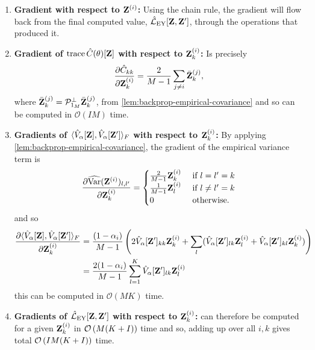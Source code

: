 \begin{enumerate}
    \item \textbf{Gradient with respect to \( \mathbf{Z}^{(i)} \):}
    Using the chain rule, the gradient will flow back from the final computed value, \( \hat{\mathcal{L}}_\text{EY}[\mathbf{Z}, \mathbf{Z}'] \), through the operations that produced it.

    \item \textbf{Gradient of \( \operatorname{trace}\hat{C}(\theta)[\mathbf{Z}] \) with respect to \( \mathbf{Z}^{(i)}_k \):}
    Is precisely
    \begin{align*}
        \frac{\partial \hat{C}_{kk}}{\partial \mathbf{Z}_k^{(i)}} = \frac{2}{M-1} \sum_{j \neq i} \bar{\mathbf{Z}}_k^{(j)},
    \end{align*}
    where $\bar{\mathbf{Z}}_k^{(j)} = \mathcal{P}_{\mathrm{1}_{{M}}}^\perp \bar{\mathbf{Z}}_k^{(j)} $, from \cref{lem:backprop-empirical-covariance} and so can be computed in \( \mathcal{O}(I M) \) time.

    \item \textbf{Gradients of $\langle \hat{V}_\alpha[\mathbf{Z}], \hat{V}_\alpha[\mathbf{Z}'] \rangle_F$ with respect to \( \mathbf{Z}^{(i)}_k \):}
    By applying \cref{lem:backprop-empirical-covariance}, the gradient of the empirical variance term is
    \begin{align*}
        \frac{\partial \widehat{\mathrm{Var}}(\mathbf{Z}^{(i)})_{l,l'}}{\partial \mathbf{Z}_k^{(i)}} =
        \begin{cases}
            \frac{2}{M-1} \mathbf{Z}^{(i)}_k & \text{ if $l=l'=k$}\\
            \frac{1}{M-1} \mathbf{Z}^{(i)}_l & \text{ if $l \neq l'=k$}\\
            0 & \text{ otherwise.}
        \end{cases}
    \end{align*}
    and so
    \begin{align*}
        \frac{\partial \langle \hat{V}_\alpha[\mathbf{Z}], \hat{V}_\alpha[\mathbf{Z}'] \rangle_F}{\partial \mathbf{Z}_k^{(i)}}
        &= \frac{(1 - \alpha_i)}{M-1}\left( 2 \hat{V}_\alpha[\mathbf{Z}']_{kk} \mathbf{Z}_k^{(i)} + \sum_l ( \hat{V}_\alpha[\mathbf{Z}']_{lk} \mathbf{Z}_l^{(i)} + \hat{V}_\alpha[\mathbf{Z}']_{kl} \mathbf{Z}_k^{(i)}) \right) \\
        &= \frac{2(1 - \alpha_i)}{M-1}\sum_{l=1}^K \hat{V}_\alpha[\mathbf{Z}']_{lk} \mathbf{Z}_l^{(i)} \\
    \end{align*}
    this can be computed in \( \mathcal{O}(M K) \) time.

    \item \textbf{Gradients of \( \hat{\mathcal{L}}_\text{EY}[\mathbf{Z}, \mathbf{Z}'] \) with respect to $\mathbf{Z}^{(i)}_k$:} can therefore be computed for a given $\mathbf{Z}^{(i)}_k$ in $\mathcal{O}\left({M (K + I)}\right)$ time and so, adding up over all $i,k$ gives total $\mathcal{O}\left({I M (K + I)}\right)$ time.


\end{enumerate}
